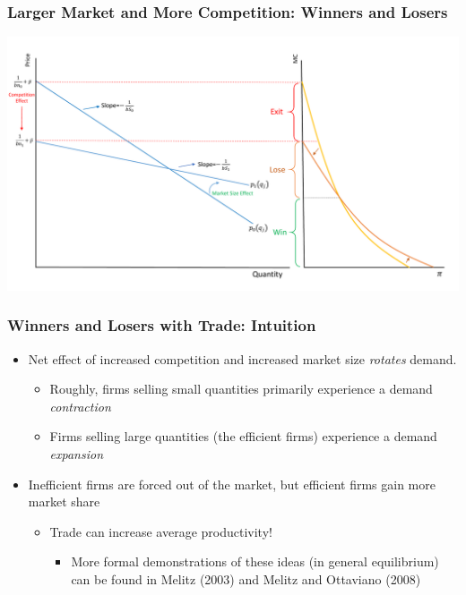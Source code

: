 \documentclass{beamer}
\begin{document}
\begin{frame}
	\frametitle{Larger Market and More Competition: Winners and Losers}
	\includegraphics[scale=0.32]{SL3_2.pdf}
\end{frame}

\begin{frame}
	\frametitle{Winners and Losers with Trade: Intuition}
\begin{itemize}
	\item Net effect of increased competition and increased market size \emph{rotates} demand.
		\begin{itemize}
			\item Roughly, firms selling small quantities primarily experience a demand \emph{contraction}
			\item Firms selling large quantities (the efficient firms) experience a demand \emph{expansion}
		\end{itemize}
	\item Inefficient firms are forced out of the market, but efficient firms gain more market share
		\begin{itemize}
			\item Trade can increase average productivity!
				\begin{itemize}
					\item More formal demonstrations of these ideas (in general equilibrium) can be found in Melitz (2003) and Melitz and Ottaviano (2008)
				\end{itemize}
		\end{itemize}
\end{itemize}
\end{frame}
\end{document}
